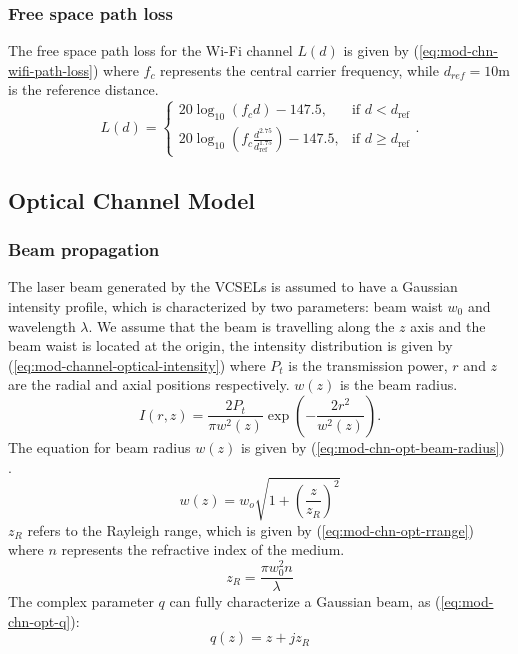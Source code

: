 \subsubsection{Free space path loss}
The free space path loss for the Wi-Fi channel $L(d)$ is given by (\ref{eq:mod-chn-wifi-path-loss}) where $f_c$ represents the central carrier frequency, while $d_{ref} = 10 \text{m}$ is the reference distance.
\begin{equation}
    L(d) = 
\begin{cases} 
20 \log_{10}(f_c d) - 147.5, & \text{if } d < d_{\text{ref}} \\
20 \log_{10}(f_c \frac{d^{2.75}}{d_{\text{ref}}^{1.75}}) - 147.5, & \text{if } d \geq d_{\text{ref}}
\end{cases}.
\label{eq:mod-chn-wifi-path-loss}
\end{equation}
\subsection{Optical Channel Model}
\label{subsec:mod-channel-optical}
\subsubsection{Beam propagation}
The laser beam generated by the VCSELs is assumed to have a Gaussian intensity profile, which is characterized by two parameters: beam waist $w_0$ and wavelength $\lambda$. We assume that the beam is travelling along the $z$ axis and the beam waist is located at the origin, the intensity distribution is given by (\ref{eq:mod-channel-optical-intensity}) \cite{saleh_fundamentals_2019} where $P_t$ is the transmission power, $r$ and $z$ are the radial and axial positions respectively. $w(z)$ is the beam radius.
\begin{equation}
    I(r,z) = \frac{2P_t}{\pi w^2(z)}\exp\left(-\frac{2r^2}{w^2(z)}\right).
    \label{eq:mod-channel-optical-intensity}
\end{equation}
The equation for beam radius $w(z)$ is given by (\ref{eq:mod-chn-opt-beam-radius}) \cite{saleh_fundamentals_2019}.
\begin{equation}
    w(z) = w_o\sqrt{1 + \left(\frac{z}{z_R}\right)^2}
    \label{eq:mod-chn-opt-beam-radius}
\end{equation}
$z_R$ refers to the Rayleigh range, which is given by (\ref{eq:mod-chn-opt-rrange}) where $n$ represents the refractive index of the medium.
\begin{equation}
    z_R = \frac{\pi w_0^2n}{\lambda}
    \label{eq:mod-chn-opt-rrange}
\end{equation}
The complex parameter $q$ can fully characterize a Gaussian beam, as (\ref{eq:mod-chn-opt-q}):
\begin{equation}
    q(z) = z + jz_R
    \label{eq:mod-chn-opt-q}
\end{equation}

